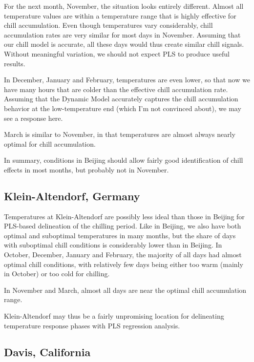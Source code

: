 \documentclass[
]{book}
\begin{document}
For the next month, November, the situation looks entirely different. Almost all temperature values are within a temperature range that is highly effective for chill accumulation. Even though temperatures vary considerably, chill accumulation rates are very similar for most days in November. Assuming that our chill model is accurate, all these days would thus create similar chill signals. Without meaningful variation, we should not expect PLS to produce useful results.

In December, January and February, temperatures are even lower, so that now we have many hours that are colder than the effective chill accumulation rate. Assuming that the Dynamic Model accurately captures the chill accumulation behavior at the low-temperature end (which I'm not convinced about), we may see a response here.

March is similar to November, in that temperatures are almost always nearly optimal for chill accumulation.

In summary, conditions in Beijing should allow fairly good identification of chill effects in most months, but probably not in November.

\hypertarget{klein-altendorf-germany}{%
\subsection{Klein-Altendorf, Germany}\label{klein-altendorf-germany}}

Temperatures at Klein-Altendorf are possibly less ideal than those in Beijing for PLS-based delineation of the chilling period. Like in Beijing, we also have both optimal and suboptimal temperatures in many months, but the share of days with suboptimal chill conditions is considerably lower than in Beijing. In October, December, January and February, the majority of all days had almost optimal chill conditions, with relatively few days being either too warm (mainly in October) or too cold for chilling.

In November and March, almost all days are near the optimal chill accumulation range.

Klein-Altendorf may thus be a fairly unpromising location for delineating temperature response phases with PLS regression analysis.

\hypertarget{davis-california}{%
\subsection{Davis, California}\label{davis-california}}
\end{document}
